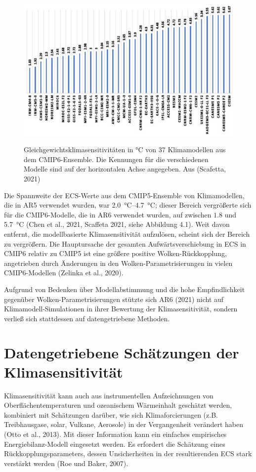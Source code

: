 \documentclass[12pt,paper=a4,DIV=12,parskip=never,chapterprefix=false,headings=standardclasses]{scrreprt}
\begin{document}
\begin{figure}[H]
\begin{center}
\includegraphics[width=1.0\textwidth]{bilder/bilderKlima-0017.jpg}\\[1cm]
\end{center}
\caption{Gleichgewichtsklimasensitivitäten in °C von 37 Klimamodellen aus dem CMIP6-Ensemble.
Die Kennungen für die verschiedenen Modelle sind auf der horizontalen Achse angegeben. Aus (Scafetta, 2021)}
\end{figure}


Die Spannweite der ECS-Werte aus dem CMIP5-Ensemble von Klimamodellen, die in AR5 verwendet wurden, war \SIrange{2.0}{4.7}{\celsius}; dieser Bereich vergrößerte sich für die CMIP6-Modelle, die in AR6 verwendet wurden, auf zwischen $1.8$ und \SI{5.7}{\celsius} (Chen et al., 2021, Scaffeta 2021, siehe Abbildung 4.1). Weit davon entfernt, die modellbasierte Klimasensitivität aufzulösen, scheint sich der Bereich zu vergrößern. Die Hauptursache der gesamten Aufwärtsverschiebung in ECS in CMIP6 relativ zu CMIP5 ist eine größere positive Wolken-Rückkopplung, angetrieben durch Änderungen in den Wolken-Parametrisierungen in vielen CMIP6-Modellen (Zelinka et al., 2020).

Aufgrund von Bedenken über Modellabstimmung und die hohe Empfindlichkeit gegenüber Wolken-Parametrisierungen stützte sich AR6 (2021) nicht auf Klimamodell-Simulationen in ihrer Bewertung der Klimasensitivität, sondern verließ sich stattdessen auf datengetriebene Methoden.

\section{Datengetriebene Schätzungen der Klimasensitivität}
Klimasensitivität kann auch aus instrumentellen Aufzeichnungen von Oberflächentemperaturen und ozeanischem Wärmeinhalt geschätzt werden, kombiniert mit Schätzungen darüber, wie sich Klimaforcierungen (z.B. Treibhausgase, solar, Vulkane, Aerosole) in der Vergangenheit verändert haben (Otto et al., 2013). Mit dieser Information kann ein einfaches empirisches Energiebilanz-Modell eingesetzt werden. Es erfordert die Schätzung eines Rückkopplungsparameters, dessen Unsicherheiten in der resultierenden ECS stark verstärkt werden (Roe und Baker, 2007).
\end{document}

